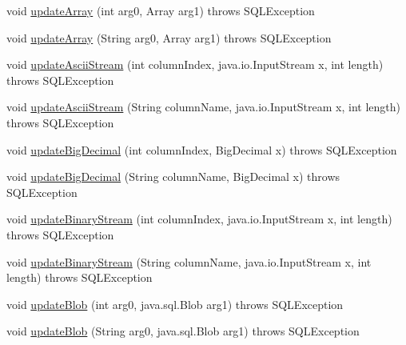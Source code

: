 \begin{DoxyCompactItemize}
\item 
void \mbox{\hyperlink{classcom_1_1mysql_1_1cj_1_1jdbc_1_1result_1_1_result_set_impl_a9b12012c80e02d4cde1c6d6a9f46e657}{update\+Array}} (int arg0, Array arg1)  throws S\+Q\+L\+Exception 
\item 
void \mbox{\hyperlink{classcom_1_1mysql_1_1cj_1_1jdbc_1_1result_1_1_result_set_impl_afa6e878d6b4247d8c90709484dde12d3}{update\+Array}} (String arg0, Array arg1)  throws S\+Q\+L\+Exception 
\item 
void \mbox{\hyperlink{classcom_1_1mysql_1_1cj_1_1jdbc_1_1result_1_1_result_set_impl_ab949c42ad9eb38d42f8ef8cb36c6cc72}{update\+Ascii\+Stream}} (int column\+Index, java.\+io.\+Input\+Stream x, int length)  throws S\+Q\+L\+Exception 
\item 
void \mbox{\hyperlink{classcom_1_1mysql_1_1cj_1_1jdbc_1_1result_1_1_result_set_impl_a35f527dc125f0fc7e781331c7e1998b9}{update\+Ascii\+Stream}} (String column\+Name, java.\+io.\+Input\+Stream x, int length)  throws S\+Q\+L\+Exception 
\item 
void \mbox{\hyperlink{classcom_1_1mysql_1_1cj_1_1jdbc_1_1result_1_1_result_set_impl_a51f8b2fd0f03408a69c2f7202dd6c32b}{update\+Big\+Decimal}} (int column\+Index, Big\+Decimal x)  throws S\+Q\+L\+Exception 
\item 
void \mbox{\hyperlink{classcom_1_1mysql_1_1cj_1_1jdbc_1_1result_1_1_result_set_impl_a798d8c01a0245b30e5a931fde57b8e66}{update\+Big\+Decimal}} (String column\+Name, Big\+Decimal x)  throws S\+Q\+L\+Exception 
\item 
void \mbox{\hyperlink{classcom_1_1mysql_1_1cj_1_1jdbc_1_1result_1_1_result_set_impl_aaa0c12c387b03229f451bcff84539da2}{update\+Binary\+Stream}} (int column\+Index, java.\+io.\+Input\+Stream x, int length)  throws S\+Q\+L\+Exception 
\item 
void \mbox{\hyperlink{classcom_1_1mysql_1_1cj_1_1jdbc_1_1result_1_1_result_set_impl_a85bcf053f7a0d99dc9d15955962e348f}{update\+Binary\+Stream}} (String column\+Name, java.\+io.\+Input\+Stream x, int length)  throws S\+Q\+L\+Exception 
\item 
void \mbox{\hyperlink{classcom_1_1mysql_1_1cj_1_1jdbc_1_1result_1_1_result_set_impl_a68f9605f3afef0c5c478686f602b1e9a}{update\+Blob}} (int arg0, java.\+sql.\+Blob arg1)  throws S\+Q\+L\+Exception 
\item 
void \mbox{\hyperlink{classcom_1_1mysql_1_1cj_1_1jdbc_1_1result_1_1_result_set_impl_aa9297e7eb25d40d93d47696ad60a65d2}{update\+Blob}} (String arg0, java.\+sql.\+Blob arg1)  throws S\+Q\+L\+Exception 
\item 

\end{DoxyCompactItemize}
